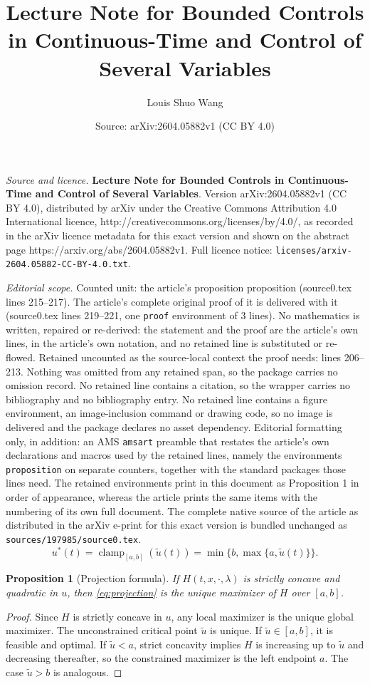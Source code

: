 \documentclass[10pt,a4paper]{amsart}
\title{\textbf{Lecture Note for Bounded Controls in Continuous-Time and Control of Several Variables}}
\author{Louis Shuo Wang}
\date{Source: arXiv:2604.05882v1 (CC BY 4.0)}
\newtheorem{proposition}{Proposition}
\newcommand{\clamp}{\operatorname{clamp}}
\begin{document}
\maketitle

\noindent\emph{Source and licence.} \textbf{Lecture Note for Bounded Controls in Continuous-Time and Control of Several Variables}. Version arXiv:2604.05882v1 (CC BY 4.0), distributed by arXiv under the Creative Commons Attribution 4.0 International licence, http://creativecommons.org/licenses/by/4.0/, as recorded in the arXiv licence metadata for this exact version and shown on the abstract page https://arxiv.org/abs/2604.05882v1. Full licence notice: \texttt{licenses/arxiv-2604.05882-CC-BY-4.0.txt}.\par\smallskip

\noindent\textit{Editorial scope.} Counted unit: the article's proposition proposition (source0.tex lines 215--217). The article's complete original proof of it is delivered with it (source0.tex lines 219--221, one \texttt{proof} environment of 3 lines). No mathematics is written, repaired or re-derived: the statement and the proof are the article's own lines, in the article's own notation, and no retained line is substituted or re-flowed.  Retained uncounted as the source-local context the proof needs: lines 206--213.  Nothing was omitted from any retained span, so the package carries no omission record.  No retained line contains a citation, so the wrapper carries no bibliography and no bibliography entry.  No retained line contains a figure environment, an image-inclusion command or drawing code, so no image is delivered and the package declares no asset dependency.  Editorial formatting only, in addition: an AMS \texttt{amsart} preamble that restates the article's own declarations and macros used by the retained lines, namely the environments \texttt{proposition} on separate counters, together with the standard packages those lines need.  The retained environments print in this document as Proposition 1 in order of appearance, whereas the article prints the same items with the numbering of its own full document.  The complete native source of the article as distributed in the arXiv e-print for this exact version is bundled unchanged as \texttt{sources/197985/source0.tex}.
\begin{equation}
\label{eq:projection}
u^*(t)
=
\clamp_{[a,b]}\!\left(\tilde u(t)\right)
=
\min\{b,\max\{a,\tilde u(t)\}\}.
\end{equation}

\begin{proposition}[Projection formula]
If $H(t,x,\cdot,\lambda)$ is strictly concave and quadratic in $u$, then \eqref{eq:projection} is the unique maximizer of $H$ over $[a,b]$.
\end{proposition}

\begin{proof}
Since $H$ is strictly concave in $u$, any local maximizer is the unique global maximizer. The unconstrained critical point $\tilde u$ is unique. If $\tilde u\in[a,b]$, it is feasible and optimal. If $\tilde u<a$, strict concavity implies $H$ is increasing up to $\tilde u$ and decreasing thereafter, so the constrained maximizer is the left endpoint $a$. The case $\tilde u>b$ is analogous.
\end{proof}
\end{document}
